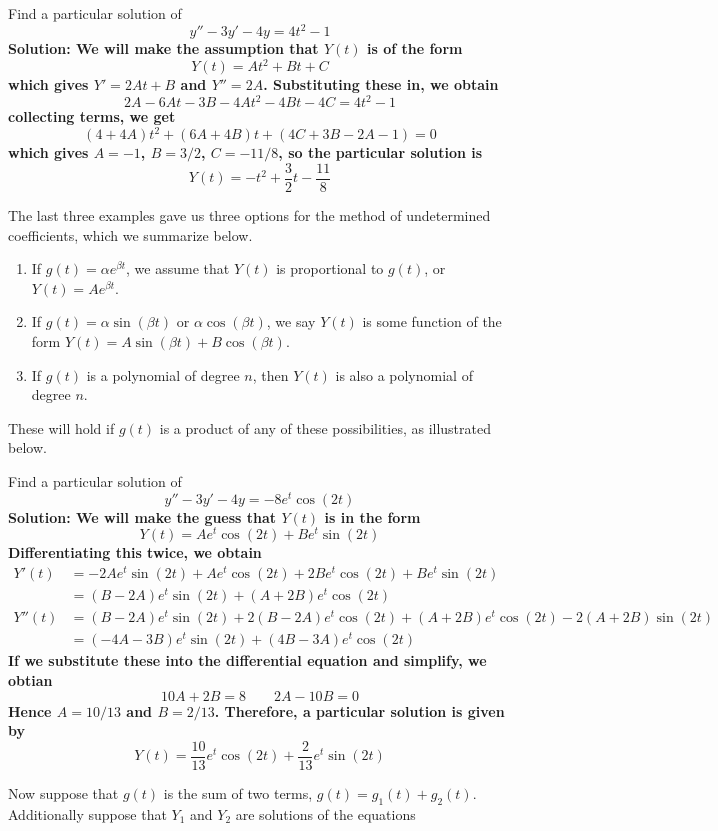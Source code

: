\begin{example}
    Find a particular solution of
    \[ y'' - 3y' - 4y = 4t^2 - 1\]
    \bf{Solution:} We will make the assumption that $Y(t)$ is of the form
    \[ Y(t) = At^2 + Bt + C \]
    which gives $Y' = 2At + B$ and $Y'' = 2A$. Substituting these in, we obtain
    \[ 2A - 6At - 3B - 4At^2 - 4Bt - 4C = 4t^2 - 1\]
    collecting terms, we get
    \[ (4+4A)t^2 + (6A + 4B)t + (4C + 3B - 2A - 1) = 0\]
    which gives $A = -1$, $B = 3/2$, $C = -11/8$, so the particular solution is
    \[ Y(t) = -t^2 + \frac{3}{2}t - \frac{11}{8} \]
\end{example}
The last three examples gave us three options for the method of undetermined coefficients, which we summarize below.
\begin{enumerate}
    \item If $g(t) = \alpha e^{\beta t}$, we assume that $Y(t)$ is proportional to $g(t)$, or $Y(t) = Ae^{\beta t}$.
    \item If $g(t) = \alpha \sin(\beta t)$ or $\alpha\cos(\beta t)$, we say $Y(t)$ is some function of the form $Y(t) = A\sin(\beta t) + B\cos(\beta t)$. 
    \item If $g(t)$ is a polynomial of degree $n$, then $Y(t)$ is also a polynomial of degree $n$.
\end{enumerate}
These will hold if $g(t)$ is a product of any of these possibilities, as illustrated below.
\begin{example}
    Find a particular solution of
    \[ y'' - 3y' - 4y = -8e^t \cos (2t) \]
    \bf{Solution:} We will make the guess that $Y(t)$ is in the form
    \[ Y(t) = Ae^{t}\cos(2t) + Be^{t}\sin(2t) \]
    Differentiating this twice, we obtain
    \begin{align*}
        Y'(t) &= -2Ae^t\sin(2t) + Ae^t\cos(2t) + 2Be^t\cos(2t) + Be^t\sin(2t) \\
        &= (B-2A)e^t\sin(2t) + (A + 2B)e^t\cos(2t) \\
        Y''(t) &= (B-2A)e^t\sin(2t) + 2(B-2A)e^t\cos(2t) + (A+2B)e^t\cos(2t) - 2(A+2B)\sin(2t) \\
        &= (-4A-3B)e^t\sin(2t) + (4B-3A)e^t\cos(2t)
    \end{align*}
    If we substitute these into the differential equation and simplify, we obtian
    \[ 10A + 2B = 8 \quad \quad 2A - 10B = 0\]
    Hence $A = 10/13$ and $B = 2/13$. Therefore, a particular solution is given by
    \[ Y(t) = \frac{10}{13}e^t\cos(2t) + \frac{2}{13}e^t\sin(2t)\]
\end{example}
Now suppose that $g(t)$ is the sum of two terms, $g(t) = g_1(t) + g_2(t)$. Additionally suppose that $Y_1$ and $Y_2$ are solutions of the equations
